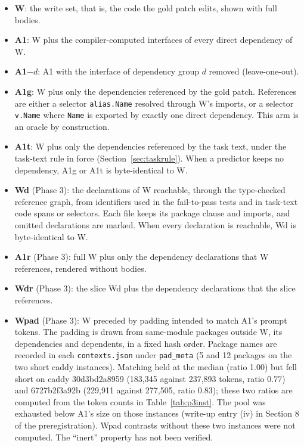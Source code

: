 \documentclass[10pt]{article}
\begin{document}
\begin{itemize}
\item \textbf{W}: the write set, that is, the code the gold patch edits, shown with full bodies.
\item \textbf{A1}: W plus the compiler-computed interfaces of every direct dependency of W.
\item \textbf{A1$-d$}: A1 with the interface of dependency group $d$ removed (leave-one-out).
\item \textbf{A1g}: W plus only the dependencies referenced by the gold patch. References are either a selector \texttt{alias.Name} resolved through W's imports, or a selector \texttt{v.Name} where \texttt{Name} is exported by exactly one direct dependency. This arm is an oracle by construction.
\item \textbf{A1t}: W plus only the dependencies referenced by the task text, under the task-text rule in force (Section~\ref{sec:taskrule}). When a predictor keeps no dependency, A1g or A1t is byte-identical to W.
\item \textbf{Wd} (Phase 3): the declarations of W reachable, through the type-checked reference graph, from identifiers used in the fail-to-pass tests and in task-text code spans or selectors. Each file keeps its package clause and imports, and omitted declarations are marked. When every declaration is reachable, Wd is byte-identical to W.
\item \textbf{A1r} (Phase 3): full W plus only the dependency declarations that W references, rendered without bodies.
\item \textbf{Wdr} (Phase 3): the slice Wd plus the dependency declarations that the slice references.
\item \textbf{Wpad} (Phase 3): W preceded by padding intended to match A1's prompt tokens. The padding is drawn from same-module packages outside W, its dependencies and dependents, in a fixed hash order. Package names are recorded in each \texttt{contexts.json} under \texttt{pad\_meta} (5 and 12 packages on the two short caddy instances). Matching held at the median (ratio 1.00) but fell short on caddy 30d3bd2a8959 (183,345 against 237,893 tokens, ratio 0.77) and 6727b2f3a92b (229,911 against 277,505, ratio 0.83); these two ratios are computed from the token counts in Table~\ref{tab:p3inst}. The pool was exhausted below A1's size on those instances (write-up entry (iv) in Section 8 of the preregistration). Wpad contrasts without these two instances were not computed. The ``inert'' property has not been verified.
\end{itemize}
\end{document}
